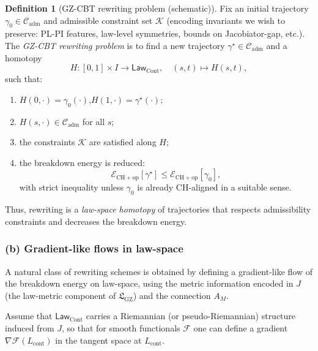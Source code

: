 \documentclass[11pt]{book}
\theoremstyle{plain}
\theoremstyle{definition}
\newtheorem{definition}[theorem]{Definition} \theoremstyle{remark}
\newcommand{\GZLS}{\ensuremath{\mathfrak{L}_{\mathrm{GZ}}}}       \newcommand{\GZLT}{\ensuremath{M_{!w}}}                           \newcommand{\GZLOC}{\ensuremath{A_M}}                             \newcommand{\GZLCurv}{\ensuremath{\mathcal{F}_{\mathrm{law}}}}
\begin{document}
\begin{definition}[GZ-CBT rewriting problem (schematic)]
  Fix an initial trajectory
  $\gamma_0\in\mathcal{C}_{\mathrm{adm}}$ and admissible constraint set
  $\mathcal{K}$ (encoding invariants we wish to preserve: PL-PI features,
  law-level symmetries, bounds on Jacobiator-gap, etc.). The
  \emph{GZ-CBT rewriting problem} is to find a new trajectory
  $\gamma^\star\in\mathcal{C}_{\mathrm{adm}}$ and a homotopy
  \[
    H:[0,1]\times I\to\mathsf{Law}_{\mathrm{Cont}},
    \quad
    (s,t)\mapsto H(s,t),
  \]
  such that:
  \begin{enumerate}[label=\roman*)]
    \item $H(0,\cdot)=\gamma_0(\cdot)$,\quad $H(1,\cdot)=\gamma^\star(\cdot)$;
    \item $H(s,\cdot)\in\mathcal{C}_{\mathrm{adm}}$ for all $s$;
    \item the constraints $\mathcal{K}$ are satisfied along $H$;
    \item the breakdown energy is reduced:
          \[
            \mathcal{E}_{\mathrm{CH+op}}[\gamma^\star]
            \le
            \mathcal{E}_{\mathrm{CH+op}}[\gamma_0],
          \]
          with strict inequality unless $\gamma_0$ is already
          CH-aligned in a suitable sense.
  \end{enumerate}
\end{definition}

Thus, rewriting is a \emph{law-space homotopy} of trajectories that
respects admissibility constraints and decreases the breakdown energy.



\subsubsection*{(b) Gradient-like flows in law-space}

A natural class of rewriting schemes is obtained by defining a
gradient-like flow of the breakdown energy on law-space, using the
metric information encoded in $J$ (the law-metric component of \GZLS)
and the connection \GZLOC.

Assume that $\mathsf{Law}_{\mathrm{Cont}}$ carries a Riemannian (or
pseudo-Riemannian) structure induced from $J$, so that for smooth
functionals $\mathcal{F}$ one can define a gradient
$\nabla\mathcal{F}(L_{\mathrm{cont}})$ in the tangent space at
$L_{\mathrm{cont}}$.
\end{document}
